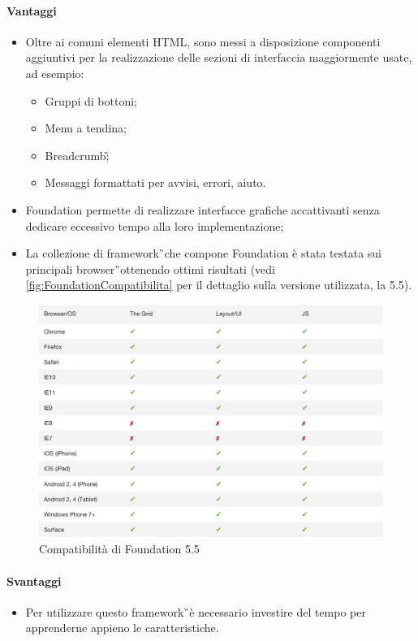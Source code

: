 \paragraph{Vantaggi}
	\begin{itemize}
		\item Oltre ai comuni elementi HTML, sono messi a disposizione componenti aggiuntivi per la realizzazione delle sezioni di interfaccia maggiormente usate, ad esempio: 
		\begin{itemize}
			\item Gruppi di bottoni;
			\item Menu a tendina;
			\item \gls{Breadcrumb}\G;
			\item Messaggi formattati per avvisi, errori, aiuto.
		\end{itemize}\item Foundation permette di realizzare interfacce grafiche accattivanti senza dedicare eccessivo tempo alla loro implementazione;
		\item La collezione di \gls{framework}\G\ che compone Foundation è stata testata sui principali \gls{browser}\G\ ottenendo ottimi risultati (vedi \autoref{fig:FoundationCompatibilita} per il dettaglio sulla versione utilizzata, la 5.5).
	\end{itemize}
	\begin{figure}[H]
		\begin{center}
			\includegraphics[width=15cm]{Pics/foundation5_compatibilita.png}
			\caption{Compatibilità di Foundation 5.5}
			\label{fig:FoundationCompatibilita}
		\end{center}
	\end{figure}
\paragraph{Svantaggi}
	\begin{itemize}
		\item Per utilizzare questo \gls{framework}\G\ è necessario investire del tempo per apprenderne appieno le caratteristiche.
	\end{itemize}
